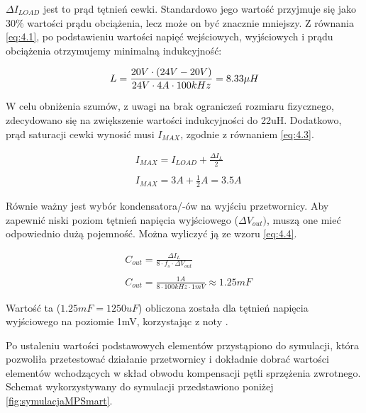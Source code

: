 $ \Delta I_{LOAD} $ jest to prąd tętnień cewki. Standardowo jego wartość przyjmuje się jako 30\% wartości prądu obciążenia, lecz może on być znacznie mniejszy.
Z równania \ref{eq:4.1}, po podstawieniu wartości napięć wejściowych, wyjściowych i prądu obciążenia otrzymujemy minimalną indukcyjność:

\begin{equation}
    \label{eq:4.2}
    L = \frac{20 V \cdot (24 V - 20 V)}{24 V \cdot  4 A \cdot 100 kHz} = 8.33 \mu H \\
\end{equation}

W celu obniżenia szumów, z uwagi na brak ograniczeń rozmiaru fizycznego, zdecydowano się na zwiększenie wartości indukcyjności do 22uH.
Dodatkowo, prąd saturacji cewki wynosić musi $I_{MAX}$, zgodnie z równaniem \ref{eq:4.3}.

\begin{equation}
    \label{eq:4.3}
    \begin{aligned}
        &I_{MAX} = I_{LOAD} + \frac{\Delta I_{L}}{2} \\ 
        \\ 
        &I_{MAX} = 3 A + \frac{1}{2} A = 3.5 A
    \end{aligned}
\end{equation}


Równie ważny jest wybór kondensatora/-ów na wyjściu przetwornicy. Aby zapewnić
niski poziom tętnień napięcia wyjściowego ($\Delta V_{out})$, muszą one mieć 
odpowiednio dużą pojemność. Można wyliczyć ją ze wzoru \ref{eq:4.4}.

\begin{equation}
    \label{eq:4.4}
    \begin{aligned}
        &C_{out} = \frac{\Delta I_{L}}{8 \cdot f_{s} \cdot \Delta V_{out}} \\ 
        \\ 
        &C_{out} = \frac{1 A}{8 \cdot 100kHz \cdot 1mV} \approx 1.25mF
    \end{aligned}
\end{equation}

Wartość ta ($1.25mF = 1250uF$) obliczona została dla tętnień napięcia wyjściowego
na poziomie 1mV, korzystając z noty \cite{obliczaniePojemnosciBuck}.


Po ustaleniu wartości podstawowych elementów przystąpiono do symulacji, która pozwoliła przetestować działanie przetwornicy i dokładnie dobrać wartości elementów wchodzących 
w skład obwodu kompensacji pętli sprzężenia zwrotnego.
Schemat wykorzystywany do symulacji przedstawiono poniżej \ref{fig:symulacjaMPSmart}.

